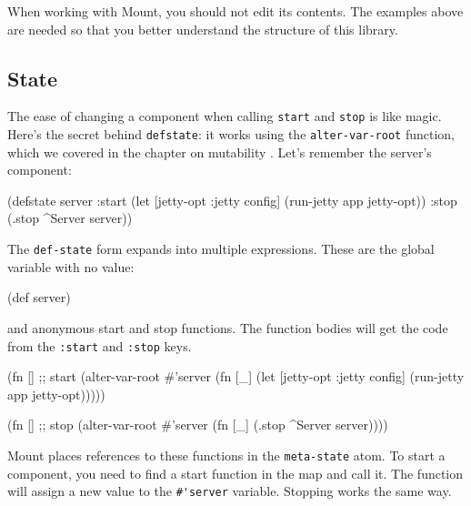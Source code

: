 When working with Mount, you should not edit its contents. The examples above are needed so that you better understand the structure of this library.

\subsection{State}


The ease of changing a component when calling \verb|start| and \verb|stop| is like magic. Here's the secret behind \verb|defstate|: it works using the \verb|alter-var-root| function, which we covered in the chapter on mutability . Let's remember the server's component:

\begin{english}
  \begin{clojure}
(defstate server
  :start (let [{jetty-opt :jetty} config]
           (run-jetty app jetty-opt))
  :stop (.stop ^Server server))
  \end{clojure}
\end{english}

The \verb|def-state| form expands  into multiple expressions. These are the global variable with no value:


\begin{english}
  \begin{clojure}
(def server)
  \end{clojure}
\end{english}

\noindent
and anonymous start and stop functions. The function bodies will get the code from the \verb|:start| and \verb|:stop| keys.

\begin{english}
  \begin{clojure}
(fn [] ;; start
  (alter-var-root #'server
   (fn [_]
     (let [{jetty-opt :jetty} config]
       (run-jetty app jetty-opt)))))

(fn [] ;; stop
  (alter-var-root #'server
   (fn [_]
     (.stop ^Server server))))
  \end{clojure}
\end{english}

Mount places references to these functions in the \verb|meta-state| atom. To start a component, you need to find a start function in the map and call it. The function will assign a new value to the \verb|#'server| variable. Stopping works the same way.

